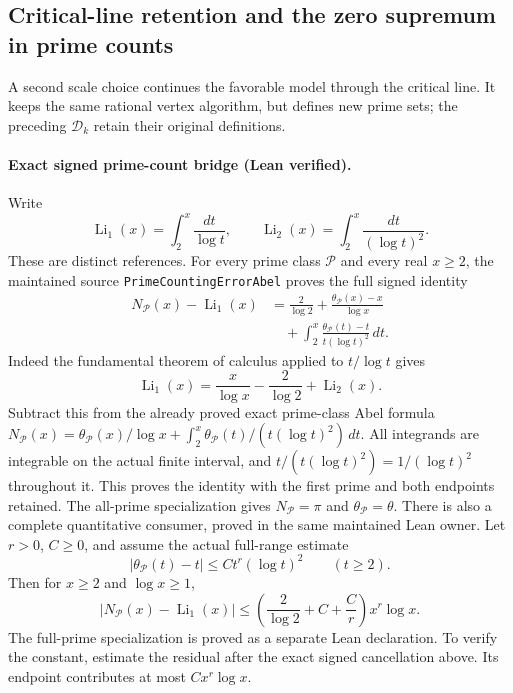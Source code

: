 \documentclass[11pt]{article}
\theoremstyle{definition}
\begin{document}
\subsection{Critical-line retention and the zero supremum in prime counts}
\label{sec:critical-deleted-prime-signal}

A second scale choice continues the favorable model through
the critical line. It keeps the same rational vertex algorithm,
but defines new prime sets; the preceding $\mathcal D_k$
retain their original definitions.

\paragraph{Exact signed prime-count bridge (Lean verified).}
Write
\[
 \operatorname{Li}_1(x)=\int_2^x\frac{dt}{\log t},\qquad
 \operatorname{Li}_2(x)=\int_2^x\frac{dt}{(\log t)^2}.
\]
These are distinct references. For every prime class \(\mathcal P\)
and every real \(x\ge2\), the maintained source
\texttt{PrimeCountingErrorAbel} proves the full signed identity
\[
 \begin{aligned}
 N_{\mathcal P}(x)-\operatorname{Li}_1(x)
 &=\frac2{\log2}+\frac{\theta_{\mathcal P}(x)-x}{\log x}\\
 &\quad+\int_2^x
       \frac{\theta_{\mathcal P}(t)-t}{t(\log t)^2}\,dt.
 \end{aligned}
\]
Indeed the fundamental theorem of calculus applied to \(t/\log t\)
gives
\[
 \operatorname{Li}_1(x)
 =\frac{x}{\log x}-\frac2{\log2}+\operatorname{Li}_2(x).
\]
Subtract this from the already proved exact prime-class Abel formula
\(N_{\mathcal P}(x)=\theta_{\mathcal P}(x)/\log x+
\int_2^x\theta_{\mathcal P}(t)/(t(\log t)^2)\,dt\).
All integrands are integrable on the actual finite interval, and
\(t/(t(\log t)^2)=1/(\log t)^2\) throughout it.
This proves the identity with the first prime and both endpoints
retained. The all-prime specialization gives \(N_{\mathcal P}=\pi\)
and \(\theta_{\mathcal P}=\theta\).
There is also a complete quantitative consumer, proved in the same
maintained Lean owner. Let \(r>0\), \(C\ge0\), and assume the actual
full-range estimate
\[
 |\theta_{\mathcal P}(t)-t|\le Ct^r(\log t)^2\qquad(t\ge2).
\]
Then for \(x\ge2\) and \(\log x\ge1\),
\[
 |N_{\mathcal P}(x)-\operatorname{Li}_1(x)|
 \le\left(\frac2{\log2}+C+\frac Cr\right)x^r\log x.
\]
The full-prime specialization is proved as a separate Lean declaration.
To verify the constant, estimate the residual after the exact signed
cancellation above. Its endpoint contributes at most \(Cx^r\log x\).
\end{document}
